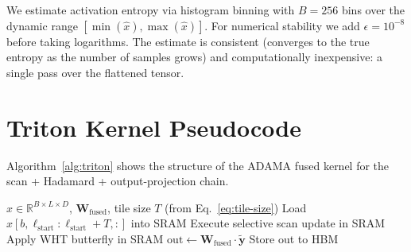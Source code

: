 \documentclass{article}
\newcommand{\mH}{\mathbf{H}}          %
\newcommand{\mW}{\mathbf{W}}          %
\newcommand{\vy}{\mathbf{y}}          %
\newcommand{\RR}{\mathbb{R}}
\begin{document}
We estimate activation entropy via histogram binning with $B = 256$ bins over
the dynamic range $[\min(\hat{x}), \max(\hat{x})]$.  For numerical stability
we add $\epsilon = 10^{-8}$ before taking logarithms.  The estimate is
consistent (converges to the true entropy as the number of samples grows) and
computationally inexpensive: a single pass over the flattened tensor.

\section{Triton Kernel Pseudocode}
\label{app:triton}

Algorithm~\ref{alg:triton} shows the structure of the ADAMA fused kernel for
the scan + Hadamard + output-projection chain.

\begin{algorithm}[tb]
  \caption{ADAMA Fused Triton Kernel (simplified)}
  \label{alg:triton}
  \begin{algorithmic}[1]
    \Require $x \in \RR^{B \times L \times D}$, $\mW_{\mathrm{fused}}$,
             tile size $T$ (from Eq.~\eqref{eq:tile-size})
      \State Load $x[b, \ell_{\mathrm{start}}:\ell_{\mathrm{start}}+T, :]$ into SRAM
      \State Execute selective scan update in SRAM
      \Comment{$\vy = \bar{A}h + \bar{B}x$}
      \State Apply WHT butterfly in SRAM
      \Comment{$\tilde{\vy} = \mH \vy / \sqrt{D}$}
      \State $\text{out} \leftarrow \mW_{\mathrm{fused}} \cdot \tilde{\vy}$
      \State Store out to HBM
    \EndFor
  \end{algorithmic}
\end{algorithm}
\end{document}
